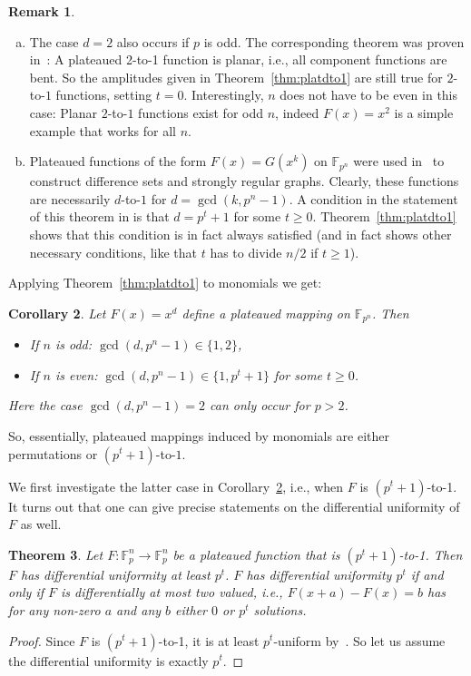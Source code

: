 \documentclass[11pt]{article}
\newcommand{\F}{\mathbb F}
\theoremstyle{plain}
\newtheorem{theorem}{Theorem}[section]
\newtheorem{corollary}[theorem]{Corollary}
\theoremstyle{definition}
\newtheorem{remark}[theorem]{Remark}
\numberwithin{theorem}{section}
\numberwithin{equation}{section}
\numberwithin{table}{section}
\numberwithin{figure}{section}
\begin{document}
{\begin{remark}
\begin{enumerate}[(a)]
    \item     The case $d=2$ also occurs if $p$ is odd. The corresponding theorem was proven in~\cite[Theorem 6.4.]{KoelschPolujan2024}: A plateaued 2-to-1 function is planar, i.e., all component functions are bent. So the amplitudes given in Theorem~\ref{thm:platdto1} are still true for $2$-to-$1$ functions, setting $t=0$. Interestingly, $n$ does not have to be even in this case: Planar $2$-to-$1$ functions exist for odd $n$, indeed $F(x)=x^2$ is a simple example that works for all $n$.\\
    \item Plateaued functions of the form $F(x)=G(x^k)$ on $\F_{p^n}$ were used in~\cite[Theorem 2]{carlet2016quadratic} to construct difference sets and strongly regular graphs. Clearly, these functions are necessarily $d$-to-$1$ for $d=\gcd(k,p^n-1)$. A condition in the statement of this theorem in \cite{carlet2016quadratic} is that $d=p^t+1$ for some $t\geq 0$. Theorem~\ref{thm:platdto1} shows that this condition is in fact always satisfied (and in fact shows other necessary conditions, like that $t$ has to divide $n/2$ if $t \geq 1$).
\end{enumerate}

\end{remark}

Applying Theorem~\ref{thm:platdto1} to monomials we get:
\begin{corollary} \label{cor:monom}
    Let $F(x)=x^d$ define a plateaued mapping on $\F_{p^n}$. Then
    \begin{itemize}
        \item If $n$ is odd: $\gcd(d,p^n-1)\in \{1,2\}$, 
        \item If $n$ is even: $\gcd(d,p^n-1)\in \{1,p^t+1\}$ for some $t \geq 0$.  
    \end{itemize}
    Here the case $\gcd(d,p^n-1)=2$ can only occur for $p>2$.
\end{corollary}
    So, essentially, plateaued mappings induced by monomials are either permutations or $(p^t+1)$-to-$1$. 
    
We first investigate the latter case in Corollary~\ref{cor:monom}, i.e., when $F$ is $(p^t+1)$-to-1. It turns out that one can give precise statements on the differential uniformity of $F$ as well.
\begin{theorem} \label{thm:diff}
     Let $F \colon \F_p^n \rightarrow \F_p^n$ be a plateaued function that is $(p^t+1)$-to-1. Then $F$ has differential uniformity at least $p^t$. $F$ has differential uniformity $p^t$ if and only if $F$ is differentially at most two valued, i.e., $F(x+a)-F(x)=b$ has for any non-zero $a$ and any $b$ either $0$ or $p^t$ solutions.
\end{theorem}
\begin{proof}
    Since $F$ is $(p^t+1)$-to-1, it is at least $p^t$-uniform by~\cite[Theorem 2]{Koelsch2023}. So let us assume the differential uniformity is exactly $p^t$. 
    

\end{proof}}
\end{document}

